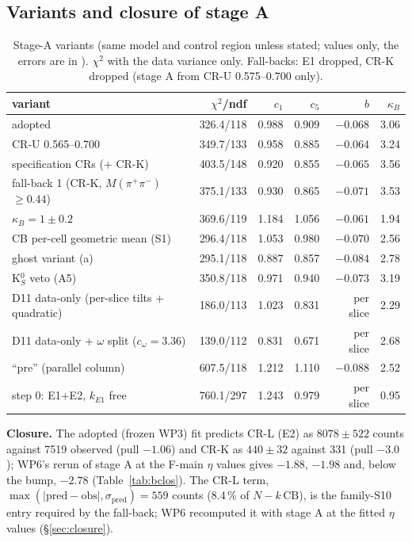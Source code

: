 \documentclass[11pt,a4paper]{article}
\newcommand{\Mpipi}{\ensuremath{M(\pi^{+}\pi^{-})}\xspace}
\newcommand{\code}[1]{\texttt{\detokenize{#1}}}
\newcommand{\kB}{\ensuremath{\kappa_B}\xspace}
\newcommand{\kEone}{\ensuremath{k_{E1}}\xspace}
\begin{document}
\subsection{Variants and closure of stage A}
\begin{table}[H]
\centering
\caption{Stage-A variants (same model and control region unless stated; values only, the errors are in \code{stageA.txt}). $\chi^2$ with the data
variance only. Fall-backs: E1 dropped, CR-K dropped (stage A from CR-U 0.575--0.700 only).}
\label{tab:stageAvar}
\small
\begin{tabular}{@{}l r r r r r@{}}
\toprule
variant & $\chi^2$/ndf & $c_1$ & $c_5$ & $b$ & \kB \\
\midrule
adopted & 326.4/118 & 0.988 & 0.909 & $-0.068$ & 3.06 \\
CR-U 0.565--0.700 & 349.7/133 & 0.958 & 0.885 & $-0.064$ & 3.24 \\
specification CRs (+ CR-K) & 403.5/148 & 0.920 & 0.855 & $-0.065$ & 3.56 \\
fall-back 1 (CR-K, \Mpipi$\ge0.44$) & 375.1/133 & 0.930 & 0.865 & $-0.071$ & 3.53 \\
$\kB=1\pm0.2$ & 369.6/119 & 1.184 & 1.056 & $-0.061$ & 1.94 \\
CB per-cell geometric mean (S1) & 296.4/118 & 1.053 & 0.980 & $-0.070$ & 2.56 \\
ghost variant (a) & 295.1/118 & 0.887 & 0.857 & $-0.084$ & 2.78 \\
K$^0_S$ veto (A5) & 350.8/118 & 0.971 & 0.940 & $-0.073$ & 3.19 \\
D11 data-only (per-slice tilts + quadratic) & 186.0/113 & 1.023 & 0.831 & per slice & 2.29 \\
D11 data-only + $\omega$ split ($c_\omega=3.36$) & 139.0/112 & 0.831 & 0.671 & per slice & 2.68 \\
``pre'' (parallel column) & 607.5/118 & 1.212 & 1.110 & $-0.088$ & 2.52 \\
step 0: E1+E2, \kEone free & 760.1/297 & 1.243 & 0.979 & per slice & 0.95 \\
\bottomrule
\end{tabular}
\end{table}

\textbf{Closure.} The adopted (frozen WP3) fit predicts CR-L (E2) as $8078\pm522$ counts against 7519 observed (pull $-1.06$) and CR-K as
$440\pm32$ against 331 (pull $-3.0$); WP6's rerun of stage A at the F-main $\eta$ values gives $-1.88$, $-1.98$ and, below the bump,
$-2.78$ (Table~\ref{tab:bclos}). The CR-L term, $\max(|\mathrm{pred}-\mathrm{obs}|,\sigma_{\mathrm{pred}})=559$ counts (8.4\,\% of $N-k\,\mathrm{CB}$),
is the family-S10 entry required by the fall-back; WP6 recomputed it with stage A at the fitted $\eta$ values (\S\ref{sec:closure}).
\end{document}
